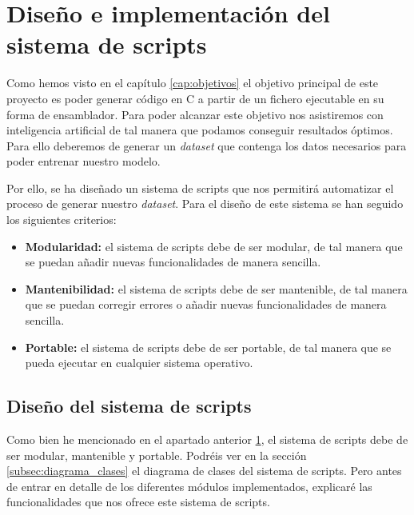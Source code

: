 \chapter{Diseño e implementación del sistema de scripts}
\label{cap:diseñoImplentacion_scripts}


Como hemos visto en el capítulo \ref{cap:objetivos} el objetivo principal de este
proyecto es poder generar código en C a partir de un fichero ejecutable en su forma
de ensamblador. Para poder alcanzar este objetivo nos asistiremos con inteligencia
artificial de tal manera que podamos conseguir resultados óptimos. Para ello deberemos
de generar un \textit{dataset} que contenga los datos necesarios para poder entrenar
nuestro modelo.

Por ello, se ha diseñado un sistema de scripts que nos permitirá automatizar el proceso
de generar nuestro \textit{dataset}. Para el diseño de este sistema se han seguido los
siguientes criterios:

\begin{itemize}
    \item \textbf{Modularidad:} el sistema de scripts debe de ser modular, de tal manera
        que se puedan añadir nuevas funcionalidades de manera sencilla.
    \item \textbf{Mantenibilidad:} el sistema de scripts debe de ser mantenible, de tal
        manera que se puedan corregir errores o añadir nuevas funcionalidades de manera
        sencilla.
    \item \textbf{Portable:} el sistema de scripts debe de ser portable, de tal manera
        que se pueda ejecutar en cualquier sistema operativo.
\end{itemize}

\section{Diseño del sistema de scripts}
\label{sec:diseño_sistema_scripts}


Como bien he mencionado en el apartado anterior \ref{cap:diseñoImplentacion_scripts}, el
sistema de scripts debe de ser modular, mantenible y portable. Podréis ver en la sección
\ref{subsec:diagrama_clases} el diagrama de clases del sistema de scripts. Pero antes de
entrar en detalle de los diferentes módulos implementados, explicaré las funcionalidades
que nos ofrece este sistema de scripts.

